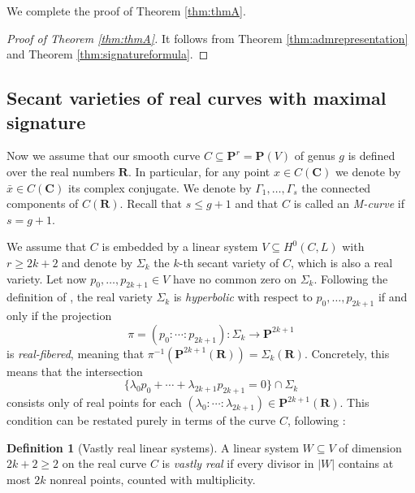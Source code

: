\documentclass[12pt]{amsart}
\newcounter{conj}
\newcounter{thmcounter}
\numberwithin{equation}{section}
\numberwithin{thmcounter}{section}
\theoremstyle{definition}
\newtheorem{definition}[thmcounter]{Definition}
\theoremstyle{claim}
\newcommand{\nR}{\mathbf{R}}
\newcommand{\nC}{\mathbf{C}}
\newcommand{\nP}{\mathbf{P}}
\begin{document}
We complete the proof of Theorem \ref{thm:thmA}.

\begin{proof}[Proof of Theorem \ref{thm:thmA}]
It follows from Theorem \ref{thm:admrepresentation} and Theorem \ref{thm:signatureformula}.
\end{proof}



\subsection{Secant varieties of real curves with maximal signature}
Now we assume that our smooth curve $C\subseteq \nP^r = \nP(V)$ of genus $g$ is defined over the real numbers $\nR$. In particular, for any point $x\in C(\nC)$ we denote by $\bar{x}\in C(\nC)$ its complex conjugate.  We denote by $\Gamma_1,\ldots,\Gamma_s$ the connected components of $C(\nR)$. Recall that $s\leq g+1$ and that $C$ is called an \emph{M-curve} if $s=g+1$.

\medskip

 We assume that $C$ is embedded by a linear system $V\subseteq H^0(C,L)$ with $r\geq 2k+2$ and denote by $\Sigma_k$ the $k$-th secant variety of $C$, which is also a real variety. Let now $p_0,\ldots,p_{2k+1}\in V$ have no common zero on $\Sigma_k$. Following the definition of \cite{shamovichvinnikov,kummershamovich}, the real variety $\Sigma_k$ is \emph{hyperbolic} with respect to $p_0,\ldots,p_{2k+1}$ if and only if the projection
 \[ \pi = (p_0:\cdots:p_{2k+1})\colon \Sigma_k \longrightarrow \nP^{2k+1} \]
 is \emph{real-fibered}, meaning that $\pi^{-1}(\nP^{2k+1}(\nR)) = \Sigma_k(\nR)$. Concretely, this means that the intersection
 \[ \{ \lambda_0p_{0}+\cdots+\lambda_{2k+1}p_{2k+1} = 0 \} \cap \Sigma_k \]
 consists only of real points for each $(\lambda_0:\cdots:\lambda_{2k+1}) \in \nP^{2k+1}(\nR)$. This condition can be restated purely in terms of the curve $C$, following \cite{kummersinn}:
 
\begin{definition}[Vastly real linear systems]
    A linear system $W \subseteq V$ of dimension $2k+2\geq 2$ on the real curve $C$ is \emph{vastly real} if every divisor in $|W|$ contains at most $2k$ nonreal points, counted with multiplicity.
\end{definition}
\end{document}
